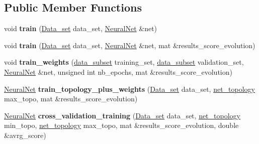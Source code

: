 \subsection*{Public Member Functions}
\begin{DoxyCompactItemize}
\item 
\hypertarget{classEvolutionary__trainer_a79cc78bf8b6ecd051b5f49635e2fdf45}{void {\bfseries train} (\hyperlink{classData__set}{Data\-\_\-set} data\-\_\-set, \hyperlink{classNeuralNet}{Neural\-Net} \&net)}\label{classEvolutionary__trainer_a79cc78bf8b6ecd051b5f49635e2fdf45}

\item 
\hypertarget{classEvolutionary__trainer_a9c10b24b701858b8b03093deb31b9e47}{void {\bfseries train} (\hyperlink{classData__set}{Data\-\_\-set} data\-\_\-set, \hyperlink{classNeuralNet}{Neural\-Net} \&net, mat \&results\-\_\-score\-\_\-evolution)}\label{classEvolutionary__trainer_a9c10b24b701858b8b03093deb31b9e47}

\item 
\hypertarget{classEvolutionary__trainer_af39aecaac59934a47705c8b30de0b1ff}{void {\bfseries train\-\_\-weights} (\hyperlink{structdata__subset}{data\-\_\-subset} training\-\_\-set, \hyperlink{structdata__subset}{data\-\_\-subset} validation\-\_\-set, \hyperlink{classNeuralNet}{Neural\-Net} \&net, unsigned int nb\-\_\-epochs, mat \&results\-\_\-score\-\_\-evolution)}\label{classEvolutionary__trainer_af39aecaac59934a47705c8b30de0b1ff}

\item 
\hypertarget{classEvolutionary__trainer_a4793d8d79f60a25b20b7d7fc4be88294}{\hyperlink{classNeuralNet}{Neural\-Net} {\bfseries train\-\_\-topology\-\_\-plus\-\_\-weights} (\hyperlink{classData__set}{Data\-\_\-set} data\-\_\-set, \hyperlink{structnet__topology}{net\-\_\-topology} max\-\_\-topo, mat \&results\-\_\-score\-\_\-evolution)}\label{classEvolutionary__trainer_a4793d8d79f60a25b20b7d7fc4be88294}

\item 
\hypertarget{classEvolutionary__trainer_a208e5af359c6062733d96d17a95b46b8}{\hyperlink{classNeuralNet}{Neural\-Net} {\bfseries cross\-\_\-validation\-\_\-training} (\hyperlink{classData__set}{Data\-\_\-set} data\-\_\-set, \hyperlink{structnet__topology}{net\-\_\-topology} min\-\_\-topo, \hyperlink{structnet__topology}{net\-\_\-topology} max\-\_\-topo, mat \&results\-\_\-score\-\_\-evolution, double \&avrg\-\_\-score)}\label{classEvolutionary__trainer_a208e5af359c6062733d96d17a95b46b8}


\end{DoxyCompactItemize}
